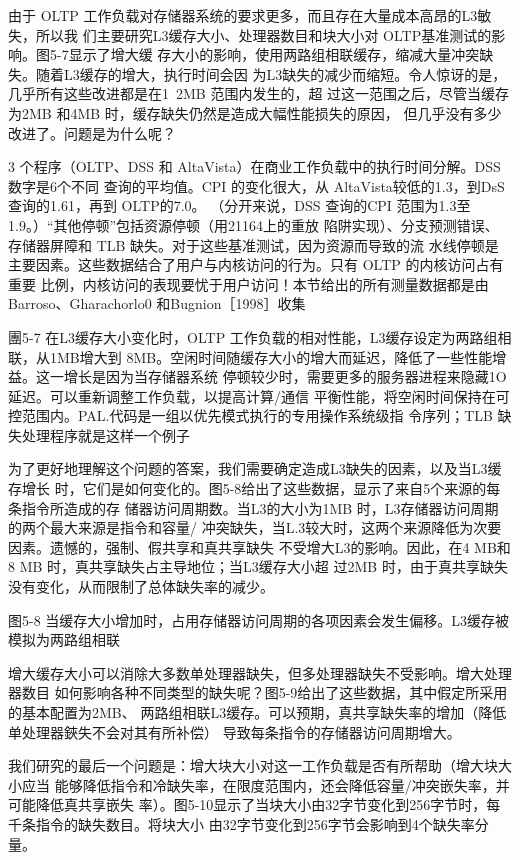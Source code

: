 由于 OLTP 工作负载对存储器系统的要求更多，而且存在大量成本高昂的L3敏失，所以我
们主要研究L3缓存大小、处理器数目和块大小对 OLTP基准测试的影响。图5-7显示了增大缓
存大小的影响，使用两路组相联缓存，缩减大量冲突缺失。随着L3缓存的增大，执行时间会因
为L3缺失的减少而缩短。令人惊讶的是，几乎所有这些改进都是在1~2MB 范围内发生的，超
过这一范围之后，尽管当缓存为2MB 和4MB 时，缓存缺失仍然是造成大幅性能损失的原因，
但几乎没有多少改进了。问题是为什么呢？

3 个程序（OLTP、DSS 和 AltaVista）在商业工作负载中的执行时间分解。DSS数字是6个不同
查询的平均值。CPI 的变化很大，从 AltaVista较低的1.3，到DsS查询的1.61，再到 OLTP的7.0。
（分开来说，DSS 查询的CPI 范围为1.3至1.9。）“其他停顿”包括资源停顿（用21164上的重放
陷阱实现）、分支预测错误、存储器屏障和 TLB 缺失。对于这些基准测试，因为资源而导致的流
水线停顿是主要因素。这些数据结合了用户与内核访问的行为。只有 OLTP 的内核访问占有重要
比例，内核访问的表现要忧于用户访问！本节给出的所有测量数据都是由 Barroso、Gharachorlo0
和Bugnion［1998］收集

團5-7 在L3缓存大小变化时，OLTP 工作负载的相对性能，L3缓存设定为两路组相联，从1MB增大到
8MB。空闲时间随缓存大小的增大而延迟，降低了一些性能增益。这一增长是因为当存储器系统
停顿较少时，需要更多的服务器进程来隐藏1O 延迟。可以重新调整工作负载，以提高计算/通信
平衡性能，将空闲时间保持在可控范围内。PAL.代码是一组以优先模式执行的专用操作系统级指
令序列；TLB 缺失处理程序就是这样一个例子

为了更好地理解这个问题的答案，我们需要确定造成L3缺失的因素，以及当L3缓存增长
时，它们是如何变化的。图5-8给出了这些数据，显示了来自5个来源的每条指令所造成的存
储器访问周期数。当L3的大小为1MB 时，L3存储器访问周期的两个最大来源是指令和容量/
冲突缺失，当L.3较大时，这两个来源降低为次要因素。遗憾的，强制、假共享和真共享缺失
不受增大L3的影响。因此，在4 MB和8 MB 时，真共享缺失占主导地位；当L3缓存大小超
过2MB 时，由于真共享缺失没有变化，从而限制了总体缺失率的减少。

图5-8 当缓存大小增加时，占用存储器访问周期的各项因素会发生偏移。L3缓存被模拟为两路组相联

增大缓存大小可以消除大多数单处理器缺失，但多处理器缺失不受影响。增大处理器数目
如何影响各种不同类型的缺失呢？图5-9给出了这些数据，其中假定所采用的基本配置为2MB、
两路组相联L3缓存。可以预期，真共享缺失率的增加（降低单处理器鋏失不会对其有所补偿）
导致每条指令的存储器访问周期增大。

我们研究的最后一个问题是：增大块大小对这一工作负载是否有所帮助（增大块大小应当
能够降低指令和冷缺失率，在限度范围内，还会降低容量/冲突嵌失率，并可能降低真共享嵌失
率）。图5-10显示了当块大小由32字节变化到256字节时，每千条指令的缺失数目。将块大小
由32字节变化到256字节会影响到4个缺失率分量。

